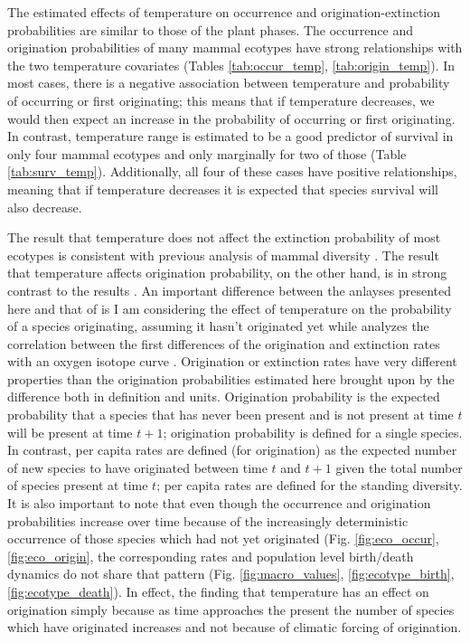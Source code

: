 \documentclass[12pt,letterpaper]{article}
\begin{document}
The estimated effects of temperature on occurrence and origination-extinction probabilities are similar to those of the plant phases. The occurrence and origination probabilities of many mammal ecotypes have strong relationships with the two temperature covariates (Tables \ref{tab:occur_temp}, \ref{tab:origin_temp}). In most cases, there is a negative association between temperature and probability of occurring or first originating; this means that if temperature decreases, we would then expect an increase in the probability of occurring or first originating. In contrast, temperature range is estimated to be a good predictor of survival in only four mammal ecotypes and only marginally for two of those (Table \ref{tab:surv_temp}). Additionally, all four of these cases have positive relationships, meaning that if temperature decreases it is expected that species survival will also decrease. 

The result that temperature does not affect the extinction probability of most ecotypes is consistent with previous analysis of mammal diversity \citep{Alroy2000g}. The result that temperature affects origination probability, on the other hand, is in strong contrast to the results \citet{Alroy2000g}. An important difference between the anlayses presented here and that of \citet{Alroy2000g} is I am considering the effect of temperature on the probability of a species originating, assuming it hasn't originated yet while \citet{Alroy2000g} analyzes the correlation between the first differences of the origination and extinction rates with an oxygen isotope curve \citep{Zachos2001}. Origination or extinction rates have very different properties than the origination probabilities estimated here brought upon by the difference both in definition and units. Origination probability is the expected probability that a species that has never been present and is not present at time \(t\) will be present at time \(t + 1\); origination probability is defined for a single species. In contrast, per capita rates are defined (for origination) as the expected number of new species to have originated between time \(t\) and \(t + 1\) given the total number of species present at time \(t\); per capita rates are defined for the standing diversity. It is also important to note that even though the occurrence and origination probabilities increase over time because of the increasingly deterministic occurrence of those species which had not yet originated (Fig. \ref{fig:eco_occur}, \ref{fig:eco_origin}, the corresponding rates and population level birth/death dynamics do not share that pattern (Fig. \ref{fig:macro_values}, \ref{fig:ecotype_birth}, \ref{fig:ecotype_death}). In effect, the finding that temperature has an effect on origination simply because as time approaches the present the number of species which have originated increases and not because of climatic forcing of origination. 
\end{document}
